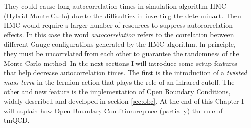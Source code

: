 \documentclass[english, LaM, oneside, noexaminfo]{sapthesis}
\newcommand{\obc}{Open Boundary Conditions}
\begin{document}
They could cause long autocorrelation times in simulation algorithm HMC (Hybrid Monte Carlo) due to the difficulties in inverting the determinant.
Then HMC would require a larger number of resources to suppress autocorrelation effects.
In this case the word {\it autocorrelation} refers to the correlation between different Gauge configurations generated by the HMC algorithm.
In principle, they must be uncorrelated from each other to guarantee the randomness of the Monte Carlo method.
\newline
In the next sections I will introduce some setup features that help decrease autocorrelation times.
The first is the introduction of a {\it twisted mass term} in the fermion action that plays the role of an infrared cutoff.
The other and new feature is the implementation of \obc, widely described and developed in section \ref{sec:obc}.
At the end of this Chapter I will explain how \obc\space replace (partially) the role of tmQCD.
\end{document}
